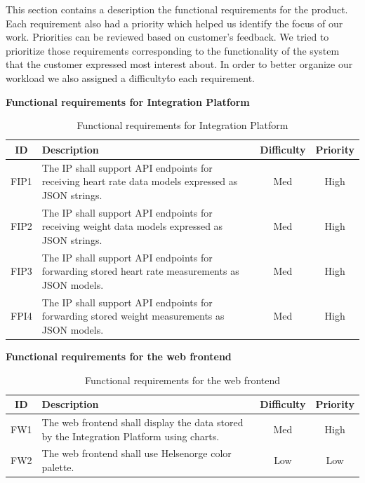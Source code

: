 This section contains a description the functional requirements for the product.
Each requirement also had a priority which helped us identify the focus of our work.
Priorities can be reviewed based on customer's feedback. We tried to prioritize those requirements corresponding
to the functionality of the system that the customer expressed most interest about. In order to better organize
our workload we also assigned a \'difficulty\' to each requirement.

\textbf{Functional requirements for Integration Platform}

\begin{table}[H]
\begin{center}
\begin{tabular}{ | c | p{9cm} | c | c | }
  \hline
  ID & Description & Difficulty & Priority\\
  \hline\noalign{\smallskip}\noalign{\smallskip}\hline
  FIP1	& The IP shall support API endpoints for receiving
          heart rate data models expressed as JSON strings.		& Med	& High \\
  FIP2	& The IP shall support API endpoints for receiving
          weight data models expressed as JSON strings.				& Med	& High \\
  FIP3	& The IP shall support API endpoints for forwarding
          stored heart rate measurements as JSON models.			& Med	& High \\
  FPI4	& The IP shall support API endpoints for forwarding
          stored weight measurements as JSON models.					& Med	& High \\
  \hline
\end{tabular}
\end{center}
\caption{Functional requirements for Integration Platform}
\label{table:reqip}
\end{table}

\textbf{Functional requirements for the web frontend}

\begin{table}[H]
\begin{center}
\begin{tabular}{ | c | p{9cm} | c | c |}
  \hline
  ID & Description & Difficulty & Priority\\
  \hline\noalign{\smallskip}\noalign{\smallskip}\hline
  FW1	& The web frontend shall display the data stored by the Integration Platform using charts.	& Med	& High \\
  FW2	& The web frontend shall use Helsenorge color palette.																			& Low	& Low \\
  \hline
\end{tabular}
\end{center}
\caption{Functional requirements for the web frontend}
\label{table:reqfrontend}
\end{table}

